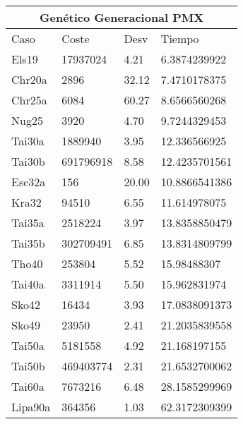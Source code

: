 \documentclass[twoside]{article}
\begin{document}
\begin{table}[h]
\centering
    \begin{tabular}{llll}
    \hline
    \multicolumn{4}{c}{Genético Generacional PMX} \\
    \toprule
    Caso               & Coste & Desv & Tiempo \\
    \midrule
    Els19&17937024&4.21&6.3874239922\\
    Chr20a&2896&32.12&7.4710178375\\
    Chr25a&6084&60.27&8.6566560268\\
    Nug25&3920&4.70&9.7244329453\\
    Tai30a&1889940&3.95&12.336566925\\
    Tai30b&691796918&8.58&12.4235701561\\
    Esc32a&156&20.00&10.8866541386\\
    Kra32&94510&6.55&11.614978075\\
    Tai35a&2518224&3.97&13.8358850479\\
    Tai35b&302709491&6.85&13.8314809799\\
    Tho40&253804&5.52&15.98488307\\
    Tai40a&3311914&5.50&15.962831974\\
    Sko42&16434&3.93&17.0838091373\\
    Sko49&23950&2.41&21.2035839558\\
    Tai50a&5181558&4.92&21.168197155\\
    Tai50b&469403774&2.31&21.6532700062\\
    Tai60a&7673216&6.48&28.1585299969\\
    Lipa90a&364356&1.03&62.3172309399\\
    \bottomrule
    \end{tabular}
    \caption{}
\end{table}
\end{document}
